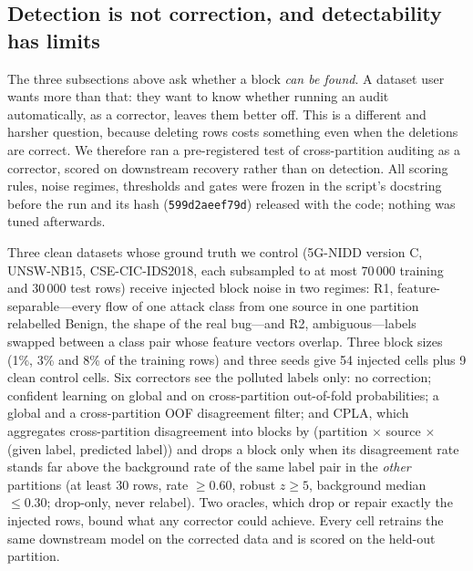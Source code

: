 \documentclass[preprint,12pt]{elsarticle}
\begin{document}
\begin{table}[t]
\centering
\caption{Block-level evaluation E9: rank of the injected block among flagged
groups, per procedure. ``Missed blocks'': scenarios where no row of the
injected block was flagged. s12/s28: ranks of the two real-bug replicas.}
\label{tab:t9}
\footnotesize
\setlength{\tabcolsep}{4pt}

\end{table}

\subsection{Detection is not correction, and detectability has limits}
\label{sec:cpla}

The three subsections above ask whether a block \emph{can be found}. A dataset
user wants more than that: they want to know whether running an
audit automatically, as a corrector, leaves them better off. This is a different
and harsher question, because deleting rows costs something even when the
deletions are correct. We therefore ran a pre-registered test of cross-partition
auditing as a corrector, scored on downstream recovery rather than on detection.
All scoring rules, noise regimes, thresholds and gates were frozen in the script's
docstring before the run and its hash (\texttt{599d2aeef79d}) released with the
code; nothing was tuned afterwards.

Three clean datasets whose ground truth we control (5G-NIDD version C,
UNSW-NB15, CSE-CIC-IDS2018, each subsampled to at most 70\,000 training and
30\,000 test rows) receive injected block noise in two regimes: R1,
feature-separable---every flow of one attack class from one source in one
partition relabelled Benign, the shape of the real bug---and R2,
ambiguous---labels swapped between a class pair whose feature vectors overlap.
Three block sizes (1\%, 3\% and 8\% of the training rows) and three seeds give
54 injected cells plus 9 clean control cells. Six correctors see the polluted
labels only: no correction; confident learning on global and on cross-partition
out-of-fold probabilities; a global and a cross-partition OOF disagreement
filter; and CPLA, which aggregates cross-partition disagreement into blocks by
(partition $\times$ source $\times$ (given label, predicted label)) and drops a
block only when its disagreement rate stands far above the background rate of
the same label pair in the \emph{other} partitions (at least 30 rows, rate
$\geq 0.60$, robust $z \geq 5$, background median $\leq 0.30$; drop-only, never
relabel). Two oracles, which drop or repair exactly the injected rows, bound
what any corrector could achieve. Every cell retrains the same downstream model
on the corrected data and is scored on the held-out partition.
\end{document}
